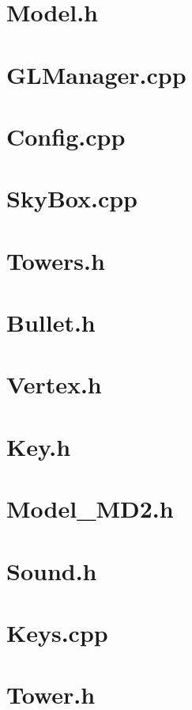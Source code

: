 \section*{Model.h}

\pagebreak
\section*{GLManager.cpp}

\pagebreak
\section*{Config.cpp}

\pagebreak
\section*{SkyBox.cpp}

\pagebreak
\section*{Towers.h}

\pagebreak
\section*{Bullet.h}

\pagebreak
\section*{Vertex.h}

\pagebreak
\section*{Key.h}

\pagebreak
\section*{Model\_MD2.h}

\pagebreak
\section*{Sound.h}

\pagebreak
\section*{Keys.cpp}

\pagebreak
\section*{Tower.h}

\pagebreak
